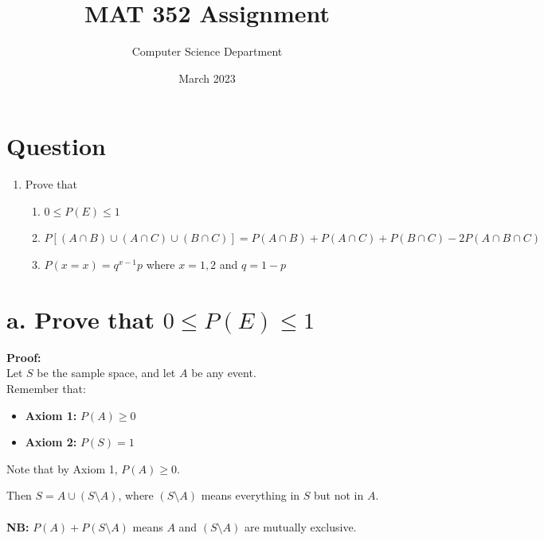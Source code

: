 \documentclass{article}
\title{MAT 352 Assignment}
\author{Computer Science Department}
\date{March 2023}
\begin{document}
\maketitle


\section*{Question}
\begin{enumerate}
    \item Prove that
        \begin{enumerate}[label=(\alph*)]
            \item $0 \leq P(E) \leq 1$
            \item $P[(A \cap B) \cup (A \cap C) \cup (B \cap C)] = P(A \cap B) + P(A \cap C) + P(B \cap C) - 2P(A \cap B \cap C)$
            \item $P(x=x) = q^{x-1}p$ where $x=1,2$ and $q = 1-p$
        \end{enumerate}
\end{enumerate}



\newpage

\section*{a. Prove that $0 \leq P(E) \leq 1$}

\textbf{Proof:}\\

Let $S$ be the sample space, and let $A$ be any event.\\

Remember that:
\begin{itemize}
    \item \textbf{Axiom 1:} $P(A) \geq 0$
    \item \textbf{Axiom 2:} $P(S) = 1$
\end{itemize}

Note that by Axiom 1, $P(A) \geq 0$.

Then $S = A \cup (S \setminus A)$, where $(S \setminus A)$ means everything in $S$ but not in $A$.
\\
\\
\textbf{NB:} $P(A) + P(S \setminus A)$ means $A$ and $(S \setminus A)$ are mutually exclusive.
\\
\\
\end{document}

